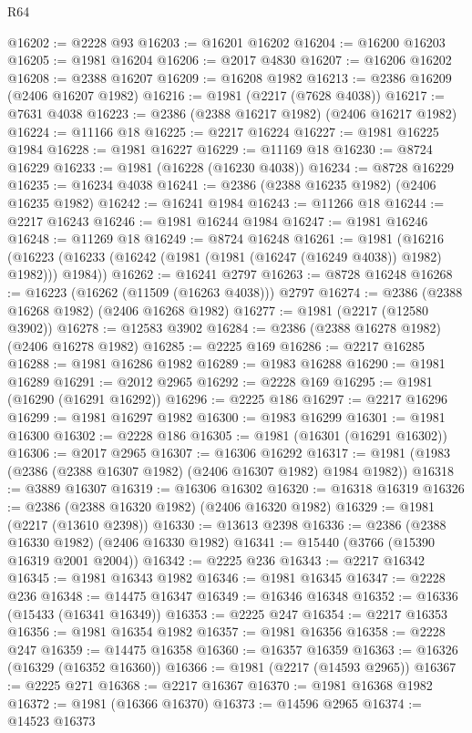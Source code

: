 \begin{lexlean}{R64}
\begin{coremodule}
@16202 := @2228 @93
@16203 := @16201 @16202
@16204 := @16200 @16203
@16205 := @1981 @16204
@16206 := @2017 @4830
@16207 := @16206 @16202
@16208 := @2388 @16207
@16209 := @16208 @1982
@16213 := @2386 @16209 (@2406 @16207 @1982)
@16216 := @1981 (@2217 (@7628 @4038))
@16217 := @7631 @4038
@16223 := @2386 (@2388 @16217 @1982) (@2406 @16217 @1982)
@16224 := @11166 @18
@16225 := @2217 @16224
@16227 := @1981 @16225 @1984
@16228 := @1981 @16227
@16229 := @11169 @18
@16230 := @8724 @16229
@16233 := @1981 (@16228 (@16230 @4038))
@16234 := @8728 @16229
@16235 := @16234 @4038
@16241 := @2386 (@2388 @16235 @1982) (@2406 @16235 @1982)
@16242 := @16241 @1984
@16243 := @11266 @18
@16244 := @2217 @16243
@16246 := @1981 @16244 @1984
@16247 := @1981 @16246
@16248 := @11269 @18
@16249 := @8724 @16248
@16261 := @1981
    (@16216 (@16223 (@16233 (@16242 (@1981 (@1981 (@16247 (@16249 @4038)) @1982) @1982))) @1984))
@16262 := @16241 @2797
@16263 := @8728 @16248
@16268 := @16223 (@16262 (@11509 (@16263 @4038))) @2797
@16274 := @2386 (@2388 @16268 @1982) (@2406 @16268 @1982)
@16277 := @1981 (@2217 (@12580 @3902))
@16278 := @12583 @3902
@16284 := @2386 (@2388 @16278 @1982) (@2406 @16278 @1982)
@16285 := @2225 @169
@16286 := @2217 @16285
@16288 := @1981 @16286 @1982
@16289 := @1983 @16288
@16290 := @1981 @16289
@16291 := @2012 @2965
@16292 := @2228 @169
@16295 := @1981 (@16290 (@16291 @16292))
@16296 := @2225 @186
@16297 := @2217 @16296
@16299 := @1981 @16297 @1982
@16300 := @1983 @16299
@16301 := @1981 @16300
@16302 := @2228 @186
@16305 := @1981 (@16301 (@16291 @16302))
@16306 := @2017 @2965
@16307 := @16306 @16292
@16317 := @1981 (@1983 (@2386 (@2388 @16307 @1982) (@2406 @16307 @1982) @1984 @1982))
@16318 := @3889 @16307
@16319 := @16306 @16302
@16320 := @16318 @16319
@16326 := @2386 (@2388 @16320 @1982) (@2406 @16320 @1982)
@16329 := @1981 (@2217 (@13610 @2398))
@16330 := @13613 @2398
@16336 := @2386 (@2388 @16330 @1982) (@2406 @16330 @1982)
@16341 := @15440 (@3766 (@15390 @16319 @2001 @2004))
@16342 := @2225 @236
@16343 := @2217 @16342
@16345 := @1981 @16343 @1982
@16346 := @1981 @16345
@16347 := @2228 @236
@16348 := @14475 @16347
@16349 := @16346 @16348
@16352 := @16336 (@15433 (@16341 @16349))
@16353 := @2225 @247
@16354 := @2217 @16353
@16356 := @1981 @16354 @1982
@16357 := @1981 @16356
@16358 := @2228 @247
@16359 := @14475 @16358
@16360 := @16357 @16359
@16363 := @16326 (@16329 (@16352 @16360))
@16366 := @1981 (@2217 (@14593 @2965))
@16367 := @2225 @271
@16368 := @2217 @16367
@16370 := @1981 @16368 @1982
@16372 := @1981 (@16366 @16370)
@16373 := @14596 @2965
@16374 := @14523 @16373

\end{coremodule}
\end{lexlean}
